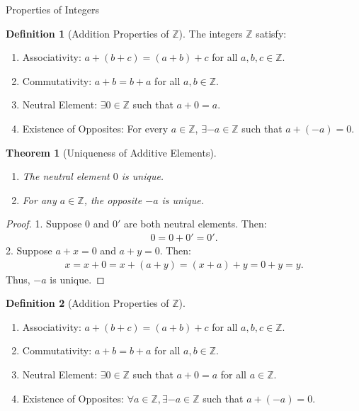 \documentclass[7pt]{article}
\theoremstyle{definition}
\newtheorem{definition}{Definition}
\theoremstyle{plain}
\newtheorem{theorem}{Theorem}
\begin{document}
{Properties of Integers}
\begin{definition}[Addition Properties of $ \mathbb{Z} $]
The integers $ \mathbb{Z} $ satisfy:
\begin{enumerate}[label=(A\arabic*)]
    \item {Associativity:} $ a + (b + c) = (a + b) + c $ for all $ a, b, c \in \mathbb{Z} $.
    \item {Commutativity:} $ a + b = b + a $ for all $ a, b \in \mathbb{Z} $.
    \item {Neutral Element:} $ \exists 0 \in \mathbb{Z} $ such that $ a + 0 = a $.
    \item {Existence of Opposites:} For every $ a \in \mathbb{Z} $, $ \exists -a \in \mathbb{Z} $ such that $ a + (-a) = 0 $.
\end{enumerate}
\end{definition}

\begin{theorem}[Uniqueness of Additive Elements]
\begin{enumerate}
    \item The neutral element $ 0 $ is unique.
    \item For any $ a \in \mathbb{Z} $, the opposite $ -a $ is unique.
\end{enumerate}
\end{theorem}

\begin{proof}
1. Suppose $ 0 $ and $ 0' $ are both neutral elements. Then:
\begin{align}
0 = 0 + 0' = 0'.
\end{align}
2. Suppose $ a + x = 0 $ and $ a + y = 0 $. Then:
\begin{align}
x = x + 0 = x + (a + y) = (x + a) + y = 0 + y = y.
\end{align}
Thus, $ -a $ is unique.
\end{proof}
\begin{definition}[Addition Properties of $ \mathbb{Z} $]
\begin{enumerate}[label=(A\arabic*)]
    \item {Associativity:} $ a + (b + c) = (a + b) + c $ for all $ a, b, c \in \mathbb{Z} $.
    \item {Commutativity:} $ a + b = b + a $ for all $ a, b \in \mathbb{Z} $.
    \item {Neutral Element:} $ \exists 0 \in \mathbb{Z} $ such that $ a + 0 = a $ for all $ a \in \mathbb{Z} $.
    \item {Existence of Opposites:} $ \forall a \in \mathbb{Z}, \exists -a \in \mathbb{Z} $ such that $ a + (-a) = 0 $.
\end{enumerate}
\end{definition}
\end{document}
